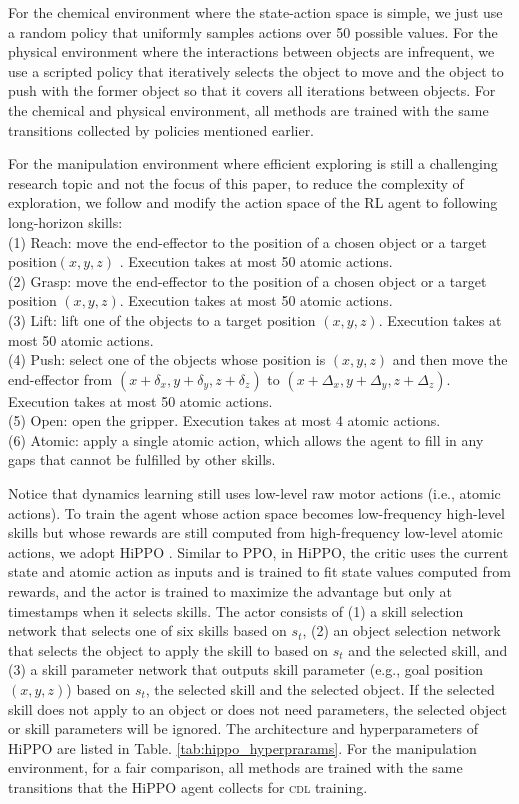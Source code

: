 For the chemical environment where the state-action space is simple, we just use a random policy that uniformly samples actions over 50 possible values. For the physical environment where the interactions between objects are infrequent, we use a scripted policy that iteratively selects the object to move and the object to push with the former object so that it covers all iterations between objects. For the chemical and physical environment, all methods are trained with the same transitions collected by policies mentioned earlier.

For the manipulation environment where efficient exploring is still a challenging research topic and not the focus of this paper, to reduce the complexity of exploration, we follow \citet{nasiriany2021maple} and modify the action space of the RL agent to following long-horizon skills: \\
(1) Reach: move the end-effector to the position of a chosen object or a target position$(x, y, z)$ . Execution takes at most 50 atomic actions. \\
(2) Grasp: move the end-effector to the position of a chosen object or a target position $(x, y, z)$. Execution takes at most 50 atomic actions. \\
(3) Lift: lift one of the objects to a target position $(x, y, z)$. Execution takes at most 50 atomic actions. \\
(4) Push: select one of the objects whose position is $(x, y, z)$ and then move the end-effector from $(x + \delta_x, y + \delta_y, z + \delta_z)$ to $(x + \Delta_x, y + \Delta_y, z + \Delta_z)$. Execution takes at most 50 atomic actions.\\
(5) Open: open the gripper. Execution takes at most 4 atomic actions. \\
(6) Atomic: apply a single atomic action, which allows the agent to fill in any gaps that cannot be fulfilled by other skills.

Notice that dynamics learning still uses low-level raw motor actions (i.e., atomic actions). To train the agent whose action space becomes low-frequency high-level skills but whose rewards are still computed from high-frequency low-level atomic actions, we adopt HiPPO \cite{li2019sub}. Similar to PPO, in HiPPO, the critic uses the current state and atomic action as inputs and is trained to fit state values computed from rewards, and the actor is trained to maximize the advantage but only at timestamps when it selects skills. The actor consists of (1) a skill selection network that selects one of six skills based on $s_t$, (2) an object selection network that selects the object to apply the skill to based on $s_t$ and the selected skill, and (3) a skill parameter network that outputs skill parameter (e.g., goal position $(x, y, z)$) based on $s_t$, the selected skill and the selected object. If the selected skill does not apply to an object or does not need parameters, the selected object or skill parameters will be ignored. The architecture and hyperparameters of HiPPO are listed in Table. \ref{tab:hippo_hyperprarams}. For the manipulation environment, for a fair comparison, all methods are trained with the same transitions that the HiPPO agent collects for \textsc{cdl} training.

